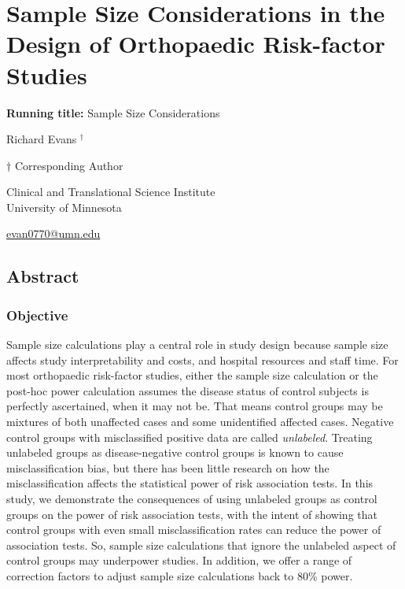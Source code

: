 \documentclass[
]{article}
\author{}
\date{\vspace{-2.5em}}
\begin{document}
\hypertarget{sample-size-considerations-in-the-design-of-orthopaedic-risk-factor-studies}{%
\section{Sample Size Considerations in the Design of Orthopaedic
Risk-factor
Studies}\label{sample-size-considerations-in-the-design-of-orthopaedic-risk-factor-studies}}

\textbf{Running title:} Sample Size Considerations

Richard Evans \({^\dagger}\)

\({\dagger}\) Corresponding Author

Clinical and Translational Science Institute\\
University of Minnesota

\href{mailto:evan0770@umn.edu}{evan0770@umn.edu}

\newpage

\hypertarget{abstract}{%
\subsection{Abstract}\label{abstract}}

\hypertarget{objective}{%
\subsubsection{Objective}\label{objective}}

Sample size calculations play a central role in study design because
sample size affects study interpretability and costs, and hospital
resources and staff time. For most orthopaedic risk-factor studies,
either the sample size calculation or the post-hoc power calculation
assumes the disease status of control subjects is perfectly ascertained,
when it may not be. That means control groups may be mixtures of both
unaffected cases and some unidentified affected cases. Negative control
groups with misclassified positive data are called \emph{unlabeled}.
Treating unlabeled groups as disease-negative control groups is known to
cause misclassification bias, but there has been little research on how
the misclassification affects the statistical power of risk association
tests. In this study, we demonstrate the consequences of using unlabeled
groups as control groups on the power of risk association tests, with
the intent of showing that control groups with even small
misclassification rates can reduce the power of association tests. So,
sample size calculations that ignore the unlabeled aspect of control
groups may underpower studies. In addition, we offer a range of
correction factors to adjust sample size calculations back to 80\%
power.
\end{document}
